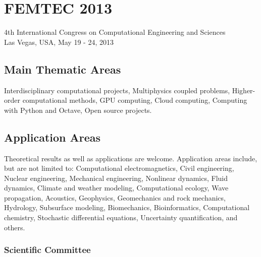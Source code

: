 \documentclass[article,A4,11pt]{llncs}%
\begin{document}
\chapter*{\huge FEMTEC 2013}
\vspace{-5mm}
\normalsize
\begin{center}
4th International Congress on Computational Engineering and Sciences\\ Las Vegas, USA, May 19 - 24, 2013
\end{center}
\vspace{-3mm}

\section*{Main Thematic Areas}%

Interdisciplinary computational projects, Multiphysics coupled problems, Higher-order computational methods, GPU computing, Cloud computing, Computing with Python and Octave, Open source projects.


\section*{Application Areas}%

Theoretical results as well as applications are welcome. Application areas include, but are not limited to: Computational electromagnetics, Civil engineering, Nuclear engineering, Mechanical engineering, Nonlinear dynamics, Fluid dynamics, Climate and weather modeling, Computational ecology, Wave propagation, Acoustics, Geophysics, Geomechanics and rock mechanics, Hydrology, Subsurface modeling, Biomechanics, Bioinformatics, Computational chemistry, Stochastic differential equations, Uncertainty quantification, and others.

\subsection*{Scientific Committee}%

\end{document}
